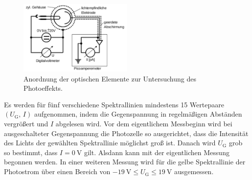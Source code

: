 \begin{figure}[h]
	\centering
	\includegraphics[width=0.5\textwidth]{Bilder/Schaltbild.pdf}
	\caption{Anordnung der optischen Elemente zur Untersuchung des Photoeffekts. \cite{skript}}
	\label{fig:schaltbild}
\end{figure}
Es werden für fünf verschiedene Spektrallinien mindestens 15 Wertepaare $\left(U_\mathup{G},\,I\right)$ aufgenommen, indem die Gegenspannung in regelmäßigen Abständen vergrößert und $I$ abgelesen wird.
Vor dem  eigentlichem Messbeginn wird bei ausgeschalteter Gegenspannung die Photozelle so ausgerichtet, dass die Intensität des Lichts der gewählten Spektrallinie möglichst groß ist. 
Danach wird $U_\mathup{G}$ grob so bestimmt, dass $I=\SI{0}{\volt}$ gilt. 
Alsdann kann mit der eigentlichen Messung begonnen werden.
In einer weiteren Messung wird für die gelbe Spektrallinie der Photostrom über einen Bereich von $\SI{-19}{\volt}\leqslant U_\mathup{G}\leqslant \SI{19}{\volt}$ ausgemessen.
\newpage